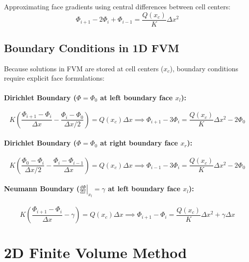 \documentclass{article}
\begin{document}
Approximating face gradients using central differences between cell centers:
\begin{equation}
    \Phi_{i+1} - 2\Phi_i + \Phi_{i-1} = \frac{Q(x_c)}{K} \Delta x^2
\end{equation}

\subsection{Boundary Conditions in 1D FVM}

Because solutions in FVM are stored at cell centers ($x_c$), boundary conditions require explicit face formulations:

\paragraph{Dirichlet Boundary ($\Phi = \Phi_0$ at left boundary face $x_l$):}
\begin{equation}
    K \left( \frac{\Phi_{i+1} - \Phi_i}{\Delta x} - \frac{\Phi_i - \Phi_0}{\Delta x / 2} \right) = Q(x_c) \Delta x \implies \Phi_{i+1} - 3\Phi_i = \frac{Q(x_c)}{K}\Delta x^2 - 2\Phi_0
\end{equation}

\paragraph{Dirichlet Boundary ($\Phi = \Phi_0$ at right boundary face $x_r$):}
\begin{equation}
    K \left( \frac{\Phi_0 - \Phi_i}{\Delta x / 2} - \frac{\Phi_i - \Phi_{i-1}}{\Delta x} \right) = Q(x_c) \Delta x \implies \Phi_{i-1} - 3\Phi_i = \frac{Q(x_c)}{K}\Delta x^2 - 2\Phi_0
\end{equation}

\paragraph{Neumann Boundary ($\left.\frac{d\Phi}{dx}\right|_{x_l} = \gamma$ at left boundary face $x_l$):}
\begin{equation}
    K \left( \frac{\Phi_{i+1} - \Phi_i}{\Delta x} - \gamma \right) = Q(x_c) \Delta x \implies \Phi_{i+1} - \Phi_i = \frac{Q(x_c)}{K}\Delta x^2 + \gamma \Delta x
\end{equation}

\section{2D Finite Volume Method}
\end{document}
